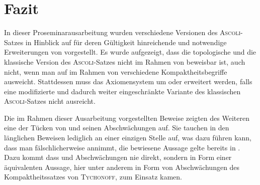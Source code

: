 \chapter{Fazit}

In dieser Proseminarausarbeitung wurden verschiedene Versionen des \textsc{Ascoli}\hyp{}Satzes in Hinblick auf für deren Gültigkeit hinreichende und notwendige Erweiterungen von \ZF vorgestellt.
Es wurde aufgezeigt, dass die topologische und die klassische Version des \textsc{Ascoli}\hyp{}Satzes nicht im Rahmen von \ZF beweisbar ist, auch nicht, wenn man auf im Rahmen von \ZF verschiedene Kompaktheitsbegriffe ausweicht.
Stattdessen muss das Axiomensystem um \PIT oder \CCR erweitert werden, falls eine modifizierte und dadurch weiter eingeschränkte Variante des klassischen \textsc{Ascoli}\hyp{}Satzes nicht ausreicht.

Die im Rahmen dieser Ausarbeitung vorgestellten Beweise zeigten des Weiteren eine der Tücken von \AC und seinen Abschwächungen auf. Sie tauchen in den länglichen Beweisen lediglich an einer einzigen Stelle auf, was dazu führen kann, dass man fälschlicherweise annimmt, die bewiesene Aussage gelte bereits in \ZF. Dazu kommt dass \AC und Abschwächungen nie direkt, sondern in Form einer äquivalenten Aussage, hier unter anderem in Form von Abschwächungen des Kompaktheitssatzes von \textsc{Tychonoff}, zum Einsatz kamen.
